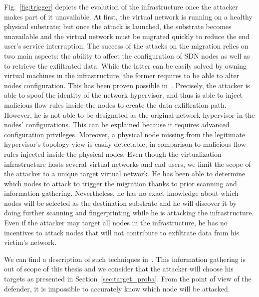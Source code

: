 \label{sec:attack_model}
Fig.~\ref{fig:trigger} depicts the evolution of the infrastructure once the attacker makes part of it unavailable. 
At first, the virtual network is running on a healthy physical substrate; but once the attack is launched, the substrate becomes unavailable and the virtual network must be migrated quickly to reduce the end user's service interruption.
The success of the attacks on the migration relies on two main aspects: the ability to affect the configuration of SDN nodes as well as  to retrieve the exfiltrated data.
While the latter can be easily solved by owning virtual machines in the infrastructure, the former requires to be able to alter nodes configuration. This has been proven possible in~\cite{Taxonomy_Hizver2015, Bokani2015, attain-Ujcich2017}.
Precisely, the attacker is able to spoof the identity of the network hypervisor, and thus is able to inject malicious flow rules inside the nodes to create the data exfiltration path. 
However, he is not able to be designated as the original network hypervisor in the nodes' configurations. 
This can be explained because it requires advanced configuration privileges. Moreover, a physical node missing from the legitimate hypervisor's topology view is easily detectable, in comparison to malicious flow rules injected inside the physical nodes.
Even though the virtualization infrastructure hosts several virtual networks and end users, we limit the scope of the attacker to a unique target virtual network. 
He has been able to determine which nodes to attack to trigger the migration thanks to prior scanning and information gathering. 
Nevertheless, he has no exact knowledge about which nodes will be selected as the destination substrate and he will discover it by doing further scanning and fingerprinting  while he is attacking the infrastructure.  
Even if the attacker may target all nodes in the infrastructure, he has no incentives to attack nodes that will not contribute to exfiltrate data from his victim's network. 

We can find a description of such techniques in~\cite{Hong2015,Sphinx-Dhawan2015}.
This information gathering is out of scope of this thesis and we consider that the attacker will choose his targets as presented in Section~\ref{sec:target_proba}.
From the point of view of the defender, it is impossible to accurately know which node will be attacked.

